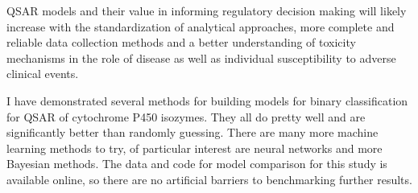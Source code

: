 

QSAR models and their value in informing regulatory decision making will likely increase with the standardization of analytical approaches, more complete and reliable data collection methods and a better understanding of toxicity mechanisms in the role of disease as well as individual susceptibility to adverse clinical events. \cite{Kruhlak2012}

I have demonstrated several methods for building models for binary classification for QSAR of cytochrome P450 isozymes. They all do pretty well and are significantly better than randomly guessing.
There are many more machine learning methods to try, of particular interest are neural networks and more Bayesian methods. The data and code for model comparison for this study is available online, so there are no artificial barriers to benchmarking further results.







